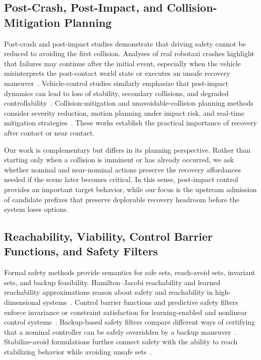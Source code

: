 \documentclass[conference]{IEEEtran}
\begin{document}
\subsection{Post-Crash, Post-Impact, and Collision-Mitigation Planning}

Post-crash and post-impact studies demonstrate that driving safety cannot be reduced to avoiding the first collision.  Analyses of real robotaxi crashes highlight that failures may continue after the initial event, especially when the vehicle misinterprets the post-contact world state or executes an unsafe recovery maneuver~\cite{koopman2024anatomy}.  Vehicle-control studies similarly emphasize that post-impact dynamics can lead to loss of stability, secondary collisions, and degraded controllability~\cite{wang2023integrated,parseh2023motion,wang2024post,yang2025post,ghosh2026post}.  Collision-mitigation and unavoidable-collision planning methods consider severity reduction, motion planning under impact risk, and real-time mitigation strategies~\cite{li2022vehicle,bosia2024real}.  These works establish the practical importance of recovery after contact or near contact.

Our work is complementary but differs in its planning perspective.  Rather than starting only when a collision is imminent or has already occurred, we ask whether nominal and near-nominal actions preserve the recovery affordances needed if the scene later becomes critical.  In this sense, post-impact control provides an important target behavior, while our focus is the upstream admission of candidate prefixes that preserve deployable recovery headroom before the system loses options.

\subsection{Reachability, Viability, Control Barrier Functions, and Safety Filters}

Formal safety methods provide semantics for safe sets, reach-avoid sets, invariant sets, and backup feasibility.  Hamilton--Jacobi reachability and learned reachability approximations reason about safety and reachability in high-dimensional systems~\cite{bansal2017hamilton,bansal2021deepreach,lin2023generating,borquez2022parameter}.  Control barrier functions and predictive safety filters enforce invariance or constraint satisfaction for learning-enabled and nonlinear control systems~\cite{ames2019control,koller2018learning,wabersich2021predictive,tearle2021predictive}.  Backup-based safety filters compare different ways of certifying that a nominal controller can be safely overridden by a backup maneuver~\cite{kim2026backup}.  Stabilize-avoid formulations further connect safety with the ability to reach stabilizing behavior while avoiding unsafe sets~\cite{so2023solving}.
\end{document}
